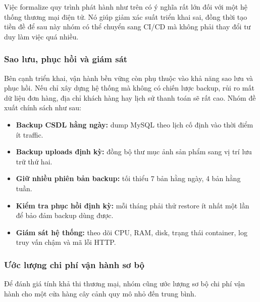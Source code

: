 \documentclass[11pt, a4paper]{article}
\begin{document}
Việc formalize quy trình phát hành như trên có ý nghĩa rất lớn đối với một hệ thống
thương mại điện tử. Nó giúp giảm xác suất triển khai sai, đồng thời tạo tiền đề để
sau này nhóm có thể chuyển sang CI/CD mà không phải thay đổi tư duy làm việc quá nhiều.

\subsubsection{Sao lưu, phục hồi và giám sát}

Bên cạnh triển khai, vận hành bền vững còn phụ thuộc vào khả năng sao lưu và phục hồi.
Nếu chỉ xây dựng hệ thống mà không có chiến lược backup, rủi ro mất dữ liệu đơn hàng,
địa chỉ khách hàng hay lịch sử thanh toán sẽ rất cao. Nhóm đề xuất chính sách như sau:

\begin{itemize}[leftmargin=*]
    \item \textbf{Backup CSDL hằng ngày:} dump MySQL theo lịch cố định vào thời điểm ít traffic.
    \item \textbf{Backup uploads định kỳ:} đồng bộ thư mục ảnh sản phẩm sang vị trí lưu trữ thứ hai.
    \item \textbf{Giữ nhiều phiên bản backup:} tối thiểu 7 bản hằng ngày, 4 bản hằng tuần.
    \item \textbf{Kiểm tra phục hồi định kỳ:} mỗi tháng phải thử restore ít nhất một lần để bảo đảm backup dùng được.
    \item \textbf{Giám sát hệ thống:} theo dõi CPU, RAM, disk, trạng thái container, log truy vấn chậm và mã lỗi HTTP.
\end{itemize}

\subsubsection{Ước lượng chi phí vận hành sơ bộ}

Để đánh giá tính khả thi thương mại, nhóm cũng ước lượng sơ bộ chi phí vận hành cho
một cửa hàng cây cảnh quy mô nhỏ đến trung bình.
\end{document}
